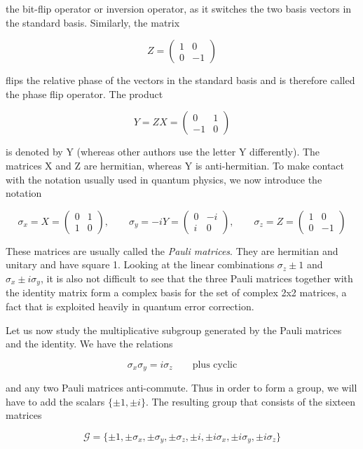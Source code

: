\documentclass[a4paper, draft]{article}
\theoremstyle{own}
\theoremstyle{remark}
\begin{document}
the bit-flip operator or inversion operator, as it switches the two basis vectors in the standard basis. Similarly, the matrix

$$
Z = \begin{pmatrix} 1 & 0 \\ 0 & -1\end{pmatrix}
$$

flips the relative phase of the vectors in the standard basis and is therefore called the phase flip operator. The product

$$
Y = ZX = \begin{pmatrix} 0 & 1 \\ -1 & 0\end{pmatrix}
$$

is denoted by Y (whereas other authors use the letter Y differently). The matrices X and Z are hermitian, whereas Y is anti-hermitian. To make contact with the notation usually used in quantum physics, we now introduce the notation

$$
\sigma_x = X = \begin{pmatrix} 0 & 1 \\ 1 & 0 \end{pmatrix}, \qquad
\sigma_y = -iY = \begin{pmatrix} 0 & -i \\ i & 0 \end{pmatrix}, \qquad
\sigma_z = Z = \begin{pmatrix} 1 & 0 \\ 0 & -1 \end{pmatrix}
$$

These matrices are usually called the \emph{Pauli matrices}. They are hermitian and unitary and have square 1. Looking at the linear combinations $\sigma_z \pm 1$ and $\sigma_x \pm i \sigma_y$, it is also not difficult to see that the three Pauli matrices together with the identity matrix form a complex basis for the set of complex 2x2 matrices, a fact that is exploited heavily in quantum error correction. 

Let us now study the multiplicative subgroup generated by the Pauli matrices and the identity. We have the relations 

$$
\sigma_x \sigma_y = i \sigma_z \qquad \text{plus cyclic}
$$

and any two Pauli matrices anti-commute. Thus in order to form a group, we will have to add the scalars $\{\pm 1, \pm i\}$. The resulting group that consists of the sixteen matrices

$$
\mathcal{G} = \{
\pm 1, \pm \sigma_x, \pm \sigma_y, \pm \sigma_z, 
\pm i, \pm i \sigma_x, \pm i \sigma_y, \pm i \sigma_z 
\}          
$$
\end{document}
